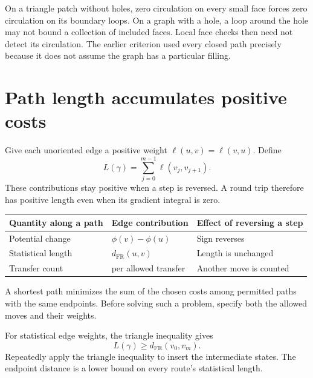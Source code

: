 \documentclass[11pt,oneside,openany]{book}
\theoremstyle{definition}
\theoremstyle{remark}
\numberwithin{equation}{chapter}
\begin{document}
On a triangle patch without holes, zero circulation on every small face forces zero circulation on its boundary loops. On a graph with a hole, a loop around the hole may not bound a collection of included faces. Local face checks then need not detect its circulation. The earlier criterion used every closed path precisely because it does not assume the graph has a particular filling.

\section{Path length accumulates positive costs}\label{ch08-path-length-accumulates-positive-costs}

Give each unoriented edge a positive weight \(\ell(u,v)=\ell(v,u)\). Define \[L(\gamma)=\sum_{j=0}^{m-1}\ell(v_j,v_{j+1}).\] These contributions stay positive when a step is reversed. A round trip therefore has positive length even when its gradient integral is zero.

\begin{longtable}[]{@{}
  >{\raggedright\arraybackslash}p{}
  >{\raggedright\arraybackslash}p{}
  >{\raggedright\arraybackslash}p{}@{}}
\toprule\noalign{}
\begin{minipage}[b]{\linewidth}\raggedright
Quantity along a path
\end{minipage} & \begin{minipage}[b]{\linewidth}\raggedright
Edge contribution
\end{minipage} & \begin{minipage}[b]{\linewidth}\raggedright
Effect of reversing a step
\end{minipage} \\
\midrule\noalign{}
\endhead
\bottomrule\noalign{}
\endlastfoot
Potential change & \(\phi(v)-\phi(u)\) & Sign reverses \\
Statistical length & \(d_{\mathrm{FR}}(u,v)\) & Length is unchanged \\
Transfer count & 1 per allowed transfer & Another move is counted \\
\end{longtable}

A shortest path minimizes the sum of the chosen costs among permitted paths with the same endpoints. Before solving such a problem, specify both the allowed moves and their weights.

For statistical edge weights, the triangle inequality gives \[L(\gamma)\geq d_{\mathrm{FR}}(v_0,v_m).\] Repeatedly apply the triangle inequality to insert the intermediate states. The endpoint distance is a lower bound on every route's statistical length.
\end{document}
